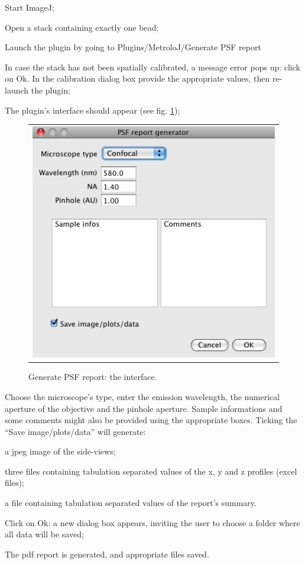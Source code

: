 \documentclass[a4paper, 11pt]{report}%
\begin{document}
\begin{enumerate*}
	\item Start ImageJ;
	\item Open a stack containing exactly one bead;
	\item Launch the plugin by going to Plugins/MetroloJ/Generate PSF report
	\item In case the stack has not been spatially calibrated, a message error pops up: click on Ok. In the calibration dialog box provide the appropriate values, then re-launch the plugin;
	\item The plugin's interface should appear (see fig. \ref{fig:gpr-interf}); 
		\begin{figure}[!ht]
			\begin{center}
				\begin{tabular}{c}
					\includegraphics[width=0.35\linewidth]{img/gpr-interf}
				\end{tabular}
			\end{center}
			\caption{\label{fig:gpr-interf}Generate PSF report: the interface.}
		\end{figure} 
	\item Choose the microscope's type, enter the emission wavelength, the numerical aperture of the objective and the pinhole aperture. Sample informations and some comments might also be provided using the appropriate boxes. Ticking the ``Save image/plots/data'' will generate:
	\begin{itemize*}
		\item a jpeg image of the side-views;
		\item three files containing tabulation separated values of the x, y and z profiles (excel files);
		\item a file containing tabulation separated values of the report's summary.
	\end{itemize*}
	\item Click on Ok: a new dialog box appears, inviting the user to choose a folder where all data will be saved;
	\item The pdf report is generated, and appropriate files saved.
\end{enumerate*}
\end{document}
